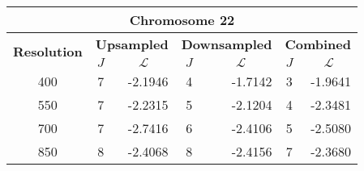 \begin{table}[h!]
  \centering
\begin{tabular}{|c|c|r|c|r|c|r|}\hline
\multicolumn{7}{|c|}{\textbf{Chromosome 22}} \\ \hline
\multirow{2}{*}{\textbf{Resolution}} & \multicolumn{2}{|c|}{\textbf{Upsampled}} &  \multicolumn{2}{|c|}{\textbf{Downsampled}} &  \multicolumn{2}{|c|}{\textbf{Combined}} \\ \cline{2-7}
    & $J$ & \multicolumn{1}{|c|}{\textbf{$\mathcal{L}$}} & $J$ & \multicolumn{1}{|c|}{\textbf{$\mathcal{L}$}} &$J$ & \multicolumn{1}{|c|}{\textbf{$\mathcal{L}$}}   \\ \hline
400 & 7 & -2.1946 & 4 & -1.7142 & 3 & -1.9641  \\ \hline
550 & 7 & -2.2315 & 5 & -2.1204 & 4 & -2.3481  \\ \hline
700 & 7 & -2.7416 & 6 & -2.4106 & 5 & -2.5080  \\ \hline
850 & 8 & -2.4068 & 8 & -2.4156 & 7 & -2.3680  \\ \hline
\end{tabular}
\end{table}



  







